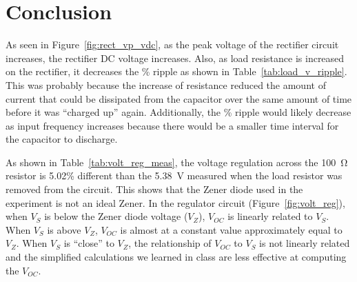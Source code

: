 \documentclass{article}
\begin{document}
\section{Conclusion}
\label{sec:conclusion}
As seen in Figure~\ref{fig:rect_vp_vdc}, as the peak voltage of the rectifier circuit increases, the rectifier DC voltage increases.  Also, as load resistance is increased on the rectifier, it decreases the \% ripple as shown in Table~\ref{tab:load_v_ripple}.  This was probably because the increase of resistance reduced the amount of current that could be dissipated from the capacitor over the same amount of time before it was “charged up” again.  Additionally, the \% ripple would likely decrease as input frequency increases because there would be a smaller time interval for the capacitor to discharge.

As shown in Table~\ref{tab:volt_reg_meas}, the voltage regulation across the \SI{100}{\ohm} resistor is 5.02\% different than the \SI{5.38}{V} measured when the load resistor was removed from the circuit.  This shows that the Zener diode used in the experiment is not an ideal Zener.  In the regulator circuit (Figure~\ref{fig:volt_reg}), when $V_S$ is below the Zener diode voltage ($V_Z$), $V_{OC}$ is linearly related to $V_S$.  When $V_S$ is above $V_Z$, $V_{OC}$ is almost at a constant value approximately equal to $V_Z$.  When $V_S$ is “close” to $V_Z$, the relationship of $V_{OC}$ to $V_S$ is not linearly related and the simplified calculations we learned in class are less effective at computing the $V_{OC}$.

%




\end{document}

